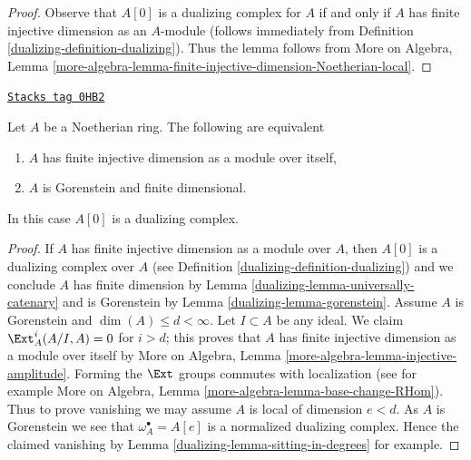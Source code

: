 \begin{proof}

Observe that $A[0]$ is a dualizing complex for $A$ if and only
if $A$ has finite injective dimension as an $A$-module
(follows immediately from Definition \ref{dualizing-definition-dualizing}).
Thus the lemma follows from More on Algebra, Lemma
\ref{more-algebra-lemma-finite-injective-dimension-Noetherian-local}.
\end{proof}

\begin{lemma}
\label{dualizing-lemma-characterize-gorenstein}
\href{https://stacks.math.columbia.edu/tag/0HB2}{\texttt{Stacks tag 0HB2}}

Let $A$ be a Noetherian ring. The following are equivalent
\begin{enumerate}
\item $A$ has finite injective dimension as a module over itself,
\item $A$ is Gorenstein and finite dimensional.
\end{enumerate}
In this case $A[0]$ is a dualizing complex.
\end{lemma}

\begin{proof}

If $A$ has finite injective dimension as a module over $A$, then
$A[0]$ is a dualizing complex over $A$
(see Definition \ref{dualizing-definition-dualizing})
and we conclude $A$ has finite dimension by
Lemma \ref{dualizing-lemma-universally-catenary} and
is Gorenstein by Lemma \ref{dualizing-lemma-gorenstein}.
Assume $A$ is Gorenstein and $\dim(A) \leq d < \infty$.
Let $I \subset A$ be any ideal. We claim $\Ext^i_A(A/I, A) = 0$
for $i > d$; this proves that $A$ has finite injective
dimension as a module over itself by
More on Algebra, Lemma \ref{more-algebra-lemma-injective-amplitude}.
Forming the $\Ext$ groups commutes with localization (see for example
More on Algebra, Lemma \ref{more-algebra-lemma-base-change-RHom}).
Thus to prove vanishing we may assume $A$ is local of
dimension $e < d$. As $A$ is Gorenstein we see that
$\omega_A^\bullet = A[e]$ is a normalized dualizing complex.
Hence the claimed vanishing by Lemma \ref{dualizing-lemma-sitting-in-degrees}
for example.
\end{proof}

